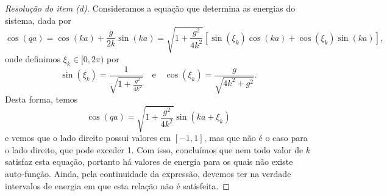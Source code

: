 \begin{proof}[Resolução do item (d)]
    Consideramos a equação que determina as energias do sistema, dada por
    \begin{equation*}
        \cos(qa) = \cos(ka) + \frac{g}{2k} \sin(ka) = \sqrt{1 + \frac{g^2}{4k^2}} \left[\sin(\xi_k)\cos(ka) + \cos(\xi_k) \sin(ka)\right],
    \end{equation*}
    onde definimos \(\xi_k \in [0, 2\pi)\) por
    \begin{equation*}
        \sin(\xi_k) = \frac{1}{\sqrt{1 + \frac{g^2}{4k^2}}}\quad\text{e}\quad \cos(\xi_k) = \frac{g}{\sqrt{4k^2 + g^2}}.
    \end{equation*}
    Desta forma, temos
    \begin{equation*}
        \cos(qa) = \sqrt{1 + \frac{g^2}{4k^2}} \sin(ka + \xi_k)
    \end{equation*}
    e vemos que o lado direito possui valores em \([-1,1]\), mas que não é o caso para o lado direito, que pode exceder 1. Com isso, concluímos que nem todo valor de \(k\) satisfaz esta equação, portanto há valores de energia para os quais não existe auto-função. Ainda, pela continuidade da expressão, devemos ter na verdade intervalos de energia em que esta relação não é satisfeita.
\end{proof}
